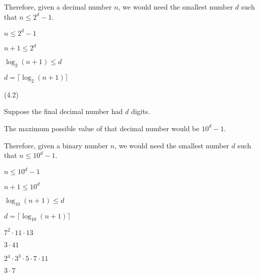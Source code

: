 \documentclass{exam}
\begin{document}
\begin{questions}
\begin{center}
Therefore, given a decimal number \(n\), we would need the smallest number \(d\) such that \(n \leq 2^d - 1\).

\(n \leq 2^d - 1\)

\(n + 1 \leq 2^d\)

\(\log_2(n+1) \leq d\)

\(d = \lceil \log_2(n+1) \rceil\)

\end{center}


 (4.2)

\begin{center}
Suppose the final decimal number had \(d\) digits.

The maximum possible value of that decimal number would be \(10^d - 1\).

Therefore, given a binary number \(n\), we would need the smallest number \(d\) such that \(n \leq 10^d - 1\).

\(n \leq 10^d - 1\)

\(n + 1 \leq 10^d\)

\(\log_{10}(n+1) \leq d\)

\(d = \lceil \log_{10}(n+1) \rceil\)

\end{center}

\begin{subparts}

\begin{center} \( 7^2 \cdot 11 \cdot 13 \) \end{center}


\begin{center} \( 3 \cdot 41 \) \end{center}


\begin{center} \( 2^4 \cdot 3^3 \cdot 5 \cdot 7 \cdot 11 \) \end{center}


\begin{center} \(3 \cdot 7 \) \end{center}

\end{subparts}


\end{questions}
\end{document}
